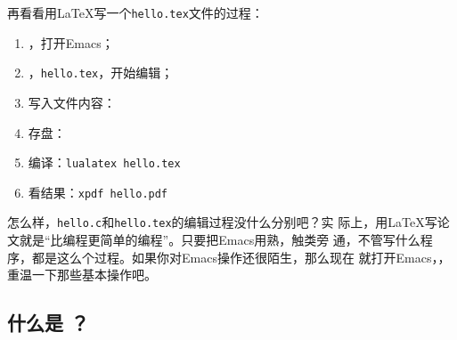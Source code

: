 再看看用\LaTeX{}写一个\texttt{hello.tex}文件的过程：

\begin{enumerate}
\item {}，打开Emacs；
\item {}，\texttt{hello.tex}，开始编辑；
\item 写入文件内容：
  \begin{codeblock}[.7]
  \end{codeblock}
\item 存盘：
\item 编译：\texttt{lualatex hello.tex}
\item 看结果：\texttt{xpdf hello.pdf}
\end{enumerate}

怎么样，\texttt{hello.c}和\texttt{hello.tex}的编辑过程没什么分别吧？实
际上，用\LaTeX{}写论文就是“比编程更简单的编程”。只要把Emacs用熟，触类旁
通，不管写什么程序，都是这么个过程。如果你对Emacs操作还很陌生，那么现在
就打开Emacs，，重温一下那些基本操作吧。

\subsection{什么是 ？}

